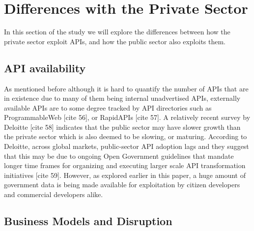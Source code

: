 \chapter{Differences with the Private Sector}

\ifpdf
    \graphicspath{{Chapter3/Figs/Raster/}{Chapter3/Figs/PDF/}{Chapter3/Figs/}}
\else
    \graphicspath{{Chapter3/Figs/Vector/}{Chapter3/Figs/}}
\fi

In this section of the study we will explore the differences between how the
private sector exploit APIs, and how the public sector also exploits them.

\section{API availability}

As mentioned before although it is hard to quantify the number of APIs that
are in existence
due to many of them being internal unadvertised APIs, externally available
APIs are to some degree tracked by API directories such as ProgrammableWeb
[cite 56], or RapidAPIs [cite 57]. A relatively recent survey by Deloitte [cite 58]
indicates that the public sector may have slower growth than the private
sector which is also deemed to be slowing, or maturing. According to
Deloitte, across global markets, public-sector API adoption lags and they
suggest that this may be due to ongoing Open Government guidelines that
mandate longer time frames for organizing and executing larger scale API
transformation initiatives [cite 59]. However, as explored earlier in this
paper, a huge amount of government data is being made available for
exploitation by citizen developers and commercial developers alike.

\section{Business Models and Disruption}

